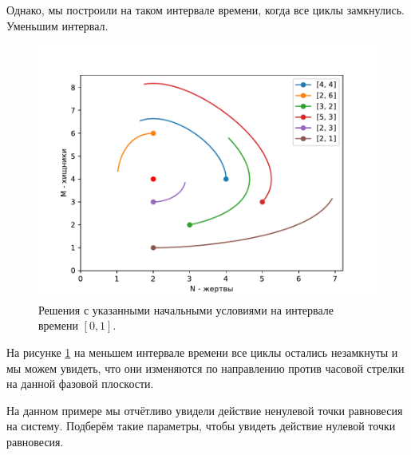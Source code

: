         Однако, мы построили на таком интервале времени, когда все циклы замкнулись. Уменьшим интервал. 


        \begin{figure}[H]
            \centering
            \includegraphics[width=12cm]{pictures/population4.pdf}
            \caption{Решения с указанными начальными условиями на интервале времени $ [0, 1] $.}\label{exp1p2}
        \end{figure}
        На рисунке \ref{exp1p2} на меньшем интервале времени все циклы остались незамкнуты и мы можем увидеть, что они изменяются по направлению против часовой стрелки на данной фазовой плоскости.

        На данном примере мы отчётливо увидели действие ненулевой точки равновесия на систему. Подберём такие параметры, чтобы увидеть действие нулевой точки равновесия.


